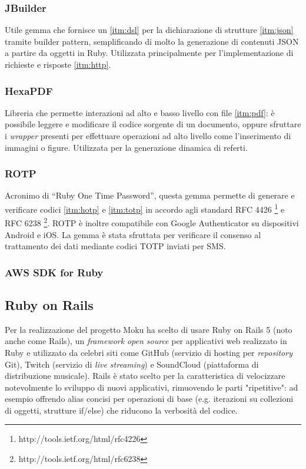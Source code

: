 \subsubsection{JBuilder}
Utile gemma che fornisce un \ref{itm:dsl} per la dichiarazione di strutture \ref{itm:json} tramite builder pattern, semplificando di molto la generazione di contenuti JSON a partire da oggetti in Ruby. Utilizzata principalmente per l'implementazione di richieste e risposte \ref{itm:http}.

\subsubsection{HexaPDF}
Libreria che permette interazioni ad alto e basso livello con file \ref{itm:pdf}: è possibile leggere e modificare il codice sorgente di un documento, oppure sfruttare i \textit{wrapper} presenti per effettuare operazioni ad alto livello come l'inserimento di immagini o figure. Utilizzata per la generazione dinamica di referti.

\subsubsection{ROTP}
Acronimo di ``Ruby One Time Password'', questa gemma permette di generare e verificare codici \ref{itm:hotp} e \ref{itm:totp} in accordo agli standard RFC 4426 \footnote[1]{http://tools.ietf.org/html/rfc4226} e RFC 6238 \footnote[2]{http://tools.ietf.org/html/rfc6238}. ROTP è inoltre compatibile con Google Authenticator su dispositivi Android e iOS. La gemma è stata sfruttata per verificare il consenso al trattamento dei dati mediante codici TOTP inviati per SMS.

\subsubsection{AWS SDK for Ruby}

\subsection{Ruby on Rails}
Per la realizzazione del progetto Moku ha scelto di usare Ruby on Rails 5 (noto anche come Rails), un \textit{framework} \textit{open source} per applicativi web realizzato in Ruby e utilizzato da celebri siti come GitHub (servizio di hosting per \textit{repository} Git), Twitch (servizio di \textit{live streaming}) e SoundCloud (piattaforma di distribuzione musicale). Rails è stato scelto per la caratteristica di velocizzare notevolmente lo sviluppo di nuovi applicativi, rimuovendo le parti "ripetitive": ad esempio offrendo alias concisi per operazioni di base (e.g. iterazioni su collezioni di oggetti, strutture if/else) che riducono la verbosità del codice.

